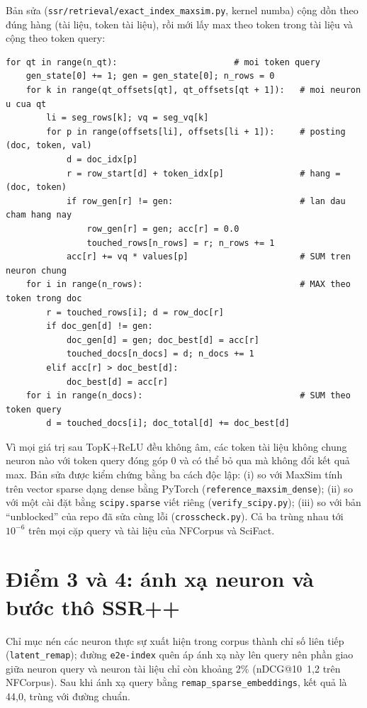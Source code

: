 \documentclass[a4paper,13pt]{extreport}
\makeatletter
\theoremstyle{plain}
\newcommand{\ssrpp}{SSR++}
\newcommand{\ndcg}{nDCG@10}
\makeatother
\begin{document}
Bản sửa (\texttt{ssr/retrieval/exact\_index\_maxsim.py}, kernel numba) cộng dồn theo đúng hàng (tài liệu, token tài liệu), rồi mới lấy max theo token trong tài liệu và cộng theo token query:
\begin{lstlisting}[caption={Kernel exact mới (rút gọn): cộng theo (doc, token) rồi mới max theo token.}]
for qt in range(n_qt):                       # moi token query
    gen_state[0] += 1; gen = gen_state[0]; n_rows = 0
    for k in range(qt_offsets[qt], qt_offsets[qt + 1]):   # moi neuron u cua qt
        li = seg_rows[k]; vq = seg_vq[k]
        for p in range(offsets[li], offsets[li + 1]):     # posting (doc, token, val)
            d = doc_idx[p]
            r = row_start[d] + token_idx[p]               # hang = (doc, token)
            if row_gen[r] != gen:                         # lan dau cham hang nay
                row_gen[r] = gen; acc[r] = 0.0
                touched_rows[n_rows] = r; n_rows += 1
            acc[r] += vq * values[p]                      # SUM tren neuron chung
    for i in range(n_rows):                               # MAX theo token trong doc
        r = touched_rows[i]; d = row_doc[r]
        if doc_gen[d] != gen:
            doc_gen[d] = gen; doc_best[d] = acc[r]
            touched_docs[n_docs] = d; n_docs += 1
        elif acc[r] > doc_best[d]:
            doc_best[d] = acc[r]
    for i in range(n_docs):                               # SUM theo token query
        d = touched_docs[i]; doc_total[d] += doc_best[d]
\end{lstlisting}
Vì mọi giá trị sau TopK+ReLU đều không âm, các token tài liệu không chung neuron nào với token query đóng góp 0 và có thể bỏ qua mà không đổi kết quả max. Bản sửa được kiểm chứng bằng ba cách độc lập: (i) so với MaxSim tính trên vector sparse dạng dense bằng PyTorch (\texttt{reference\_maxsim\_dense}); (ii) so với một cài đặt bằng \texttt{scipy.sparse} viết riêng (\texttt{verify\_scipy.py}); (iii) so với bản ``unblocked'' của repo đã sửa cùng lỗi (\texttt{crosscheck.py}). Cả ba trùng nhau tới $10^{-6}$ trên mọi cặp query và tài liệu của NFCorpus và SciFact.

\section{Điểm 3 và 4: ánh xạ neuron và bước thô \ssrpp}
Chỉ mục nén các neuron thực sự xuất hiện trong corpus thành chỉ số liên tiếp (\texttt{latent\_remap}); đường \texttt{e2e-index} quên áp ánh xạ này lên query nên phần giao giữa neuron query và neuron tài liệu chỉ còn khoảng 2\% (\ndcg\ 1,2 trên NFCorpus). Sau khi ánh xạ query bằng \texttt{remap\_sparse\_embeddings}, kết quả là 44,0, trùng với đường chuẩn.
\end{document}
